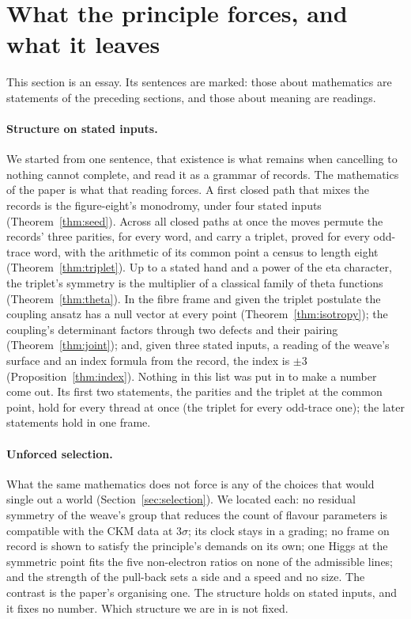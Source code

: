 \section{What the principle forces, and what it leaves}\label{sec:essay}

This section is an essay. Its sentences are marked: those about mathematics are statements of the preceding sections,
and those about meaning are readings.

\paragraph{Structure on stated inputs.}
We started from one sentence, that existence is what remains when cancelling to nothing cannot complete, and read it as
a grammar of records. The mathematics of the paper is what that reading forces. A first closed path that mixes the
records is the figure-eight's monodromy, under four stated inputs (Theorem~\ref{thm:seed}). Across all closed paths at
once the moves permute the records' three parities, for every word, and carry a triplet, proved for every odd-trace word, with
the arithmetic of its common point a census to length eight (Theorem~\ref{thm:triplet}). Up to a stated hand and a power of the eta character, the triplet's
symmetry is the multiplier of a classical family of theta functions (Theorem~\ref{thm:theta}). In the fibre frame and
given the triplet postulate the coupling ansatz has a null vector at every point (Theorem~\ref{thm:isotropy}); the coupling's
determinant factors through two defects and their pairing (Theorem~\ref{thm:joint}); and, given three stated inputs, a
reading of the weave's surface and an index formula from the record, the index is $\pm3$ (Proposition~\ref{thm:index}). Nothing in this list was
put in to make a number come out. Its first two statements, the parities and the triplet at the common point, hold for every thread at once (the triplet for every odd-trace one); the later
statements hold in one frame.

\paragraph{Unforced selection.}
What the same mathematics does not force is any of the choices that would single out a world (Section~\ref{sec:selection}).
We located each: no residual symmetry of the weave's group that reduces the count of flavour parameters is compatible with the CKM data at
$3\sigma$; its clock stays in a grading; no frame on record is shown to satisfy the principle's demands on its own; one Higgs at the symmetric point fits the five
non-electron ratios on none of the admissible lines; and the strength of the pull-back sets a side and a speed and no
size. The contrast is the paper's organising one. The structure holds on stated inputs, and it fixes no number. Which structure we are in is not fixed.

